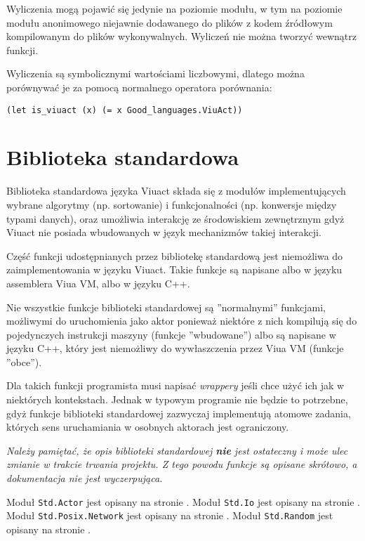Wyliczenia mogą pojawić się jedynie na poziomie modułu, w tym na poziomie modułu anonimowego niejawnie
dodawanego do plików z kodem źródłowym kompilowanym do plików wykonywalnych. Wyliczeń nie można tworzyć
wewnątrz funkcji.

Wyliczenia są symbolicznymi wartościami liczbowymi, dlatego można porównywać je
za pomocą normalnego operatora porównania:

\begin{lstlisting}
(let is_viuact (x) (= x Good_languages.ViuAct))
\end{lstlisting}

\section{Biblioteka standardowa}

Biblioteka standardowa języka Viuact składa się z modułów implementujących wybrane algorytmy (np. sortowanie)
i funkcjonalności (np. konwersje między typami danych), oraz umożliwia interakcję ze środowiskiem zewnętrznym
gdyż Viuact nie posiada wbudowanych w język mechanizmów takiej interakcji.

Część funkcji udostępnianych przez bibliotekę standardową jest niemożliwa do zaimplementowania w języku
Viuact. Takie funkcje są napisane albo w języku assemblera Viua VM, albo w języku C++.

Nie wszystkie funkcje biblioteki standardowej są ''normalnymi'' funkcjami, możliwymi do uruchomienia jako
aktor ponieważ niektóre z nich kompilują się do pojedynczych instrukcji maszyny (funkcje ''wbudowane'') albo
są napisane w języku C++, który jest niemożliwy do wywłaszczenia przez Viua VM (funkcje ''obce'').

Dla takich funkcji programista musi napisać \emph{wrappery} jeśli chce użyć ich jak w niektórych kontekstach.
Jednak w typowym programie nie będzie to potrzebne, gdyż funkcje biblioteki standardowej zazwyczaj
implementują atomowe zadania, których sens uruchamiania w osobnych aktorach jest ograniczony.

\begin{center}
\emph{Należy pamiętać, że opis biblioteki standardowej \textbf{nie} jest ostateczny i może ulec zmianie w
trakcie trwania projektu. Z tego powodu funkcje są opisane skrótowo, a dokumentacja nie jest wyczerpująca.}
\end{center}

Moduł \texttt{Std.Actor} jest opisany na stronie \pageref{stdlib_Std_Actor}.
Moduł \texttt{Std.Io} jest opisany na stronie \pageref{stdlib_Std_Io}.
Moduł \texttt{Std.Posix.Network} jest opisany na stronie \pageref{stdlib_Std_Posix_Network}.
Moduł \texttt{Std.Random} jest opisany na stronie \pageref{stdlib_Std_Random}.

